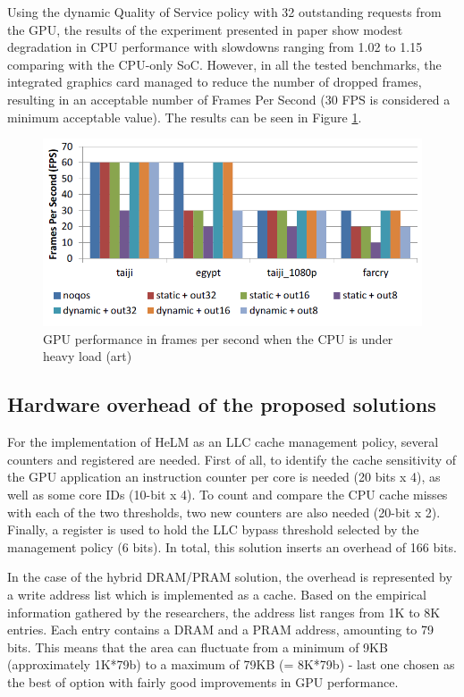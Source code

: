 \documentclass[10pt,journal,compsoc]{IEEEtran}
\begin{document}
Using the dynamic Quality of Service policy with 32 outstanding requests from the GPU, the results of the experiment presented in paper \cite{QoS} show modest degradation in CPU performance with slowdowns ranging from 1.02 to 1.15 comparing with the CPU-only SoC. However, in all the tested benchmarks, the integrated graphics card managed to reduce the number of dropped frames, resulting in an acceptable number of Frames Per Second (30 FPS is considered a minimum acceptable value). The results can be seen in Figure \ref{QoSFPS}.

\begin{figure}[H]
	\centering
	\includegraphics[width = 9 cm]{graphics/QoSfps.PNG}
	\caption{GPU performance in frames per second when the CPU is under heavy load (art)\cite{QoS}}\label{QoSFPS}
\end{figure}

\subsection{Hardware overhead of the proposed solutions}
For the implementation of HeLM as an LLC cache management policy, several counters and registered are needed. First of all, to identify the cache sensitivity of the GPU application an instruction counter per core is needed (20 bits x 4), as well as some core IDs (10-bit x 4). To count and compare the CPU cache misses with each of the two thresholds, two new counters are also needed (20-bit x 2). Finally, a register is used to hold the LLC bypass threshold selected by the management policy (6 bits). In total, this solution inserts an overhead of 166 bits.

In the case of the hybrid DRAM/PRAM solution, the overhead is represented by a write address list which is implemented as a cache. Based on the empirical information gathered by the researchers, the address list ranges from 1K to 8K entries. Each entry contains a DRAM and a PRAM address, amounting to 79 bits. This means that the area can fluctuate from a minimum of 9KB (approximately 1K*79b) to a maximum of 79KB (= 8K*79b) - last one chosen as the best of option with fairly good improvements in GPU performance.
\end{document}
